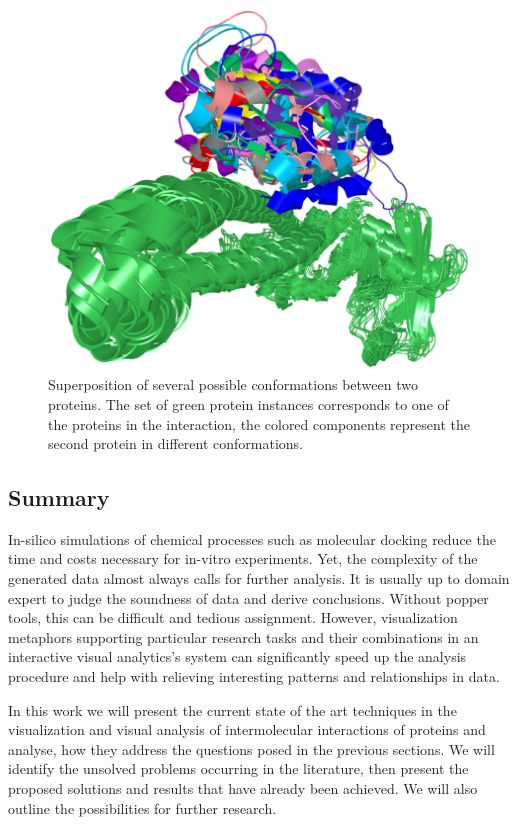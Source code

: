 \begin{figure}[H]
  \centering
  \includegraphics[width=0.45\linewidth]{pictures/problem.png} 
  \caption{Superposition of several possible conformations between two proteins. The set of green protein instances corresponds to one of the proteins in the interaction, the colored components represent the second protein in different conformations.}
  \label{Fig:problem}  
\end{figure} 

\subsection{Summary}
In-silico simulations of chemical processes such as molecular docking reduce the time and costs necessary for in-vitro experiments. Yet, the complexity of the generated data almost always calls for further analysis. It is usually up to domain expert to judge the soundness of data and derive conclusions. Without popper tools, this can be difficult and tedious assignment. However, visualization metaphors supporting particular research tasks and  their combinations in an interactive visual analytics's system can significantly speed up the analysis procedure and help with relieving interesting patterns and relationships in data. 

In this work we will present the current state of the art techniques in the visualization and visual analysis of intermolecular interactions of proteins and analyse, how they address the questions posed in the previous sections. We will identify the unsolved problems occurring in the literature, then present the proposed solutions and results that have already been achieved. We will also outline the possibilities for further research.